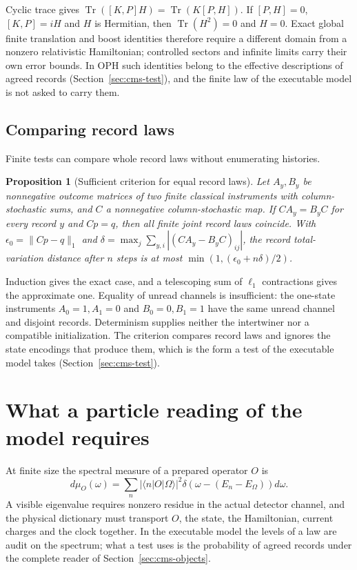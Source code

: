 \documentclass[11pt]{article}
\newtheorem{proposition}[theorem]{Proposition}
\begin{document}
Cyclic trace gives $\operatorname{Tr}([K,P]H)=\operatorname{Tr}(K[P,H])$. If
$[P,H]=0$, $[K,P]=iH$ and $H$ is Hermitian, then $\operatorname{Tr}(H^2)=0$ and $H=0$.
Exact global finite translation and boost identities therefore require a different
domain from a nonzero relativistic Hamiltonian; controlled sectors and infinite limits
carry their own error bounds. In OPH such identities belong to the effective
descriptions of agreed records (Section~\ref{sec:cms-test}), and the finite law of the
executable model is not asked to carry them.

\subsection{Comparing record laws}

Finite tests can compare whole record laws without enumerating histories.

\begin{proposition}[Sufficient criterion for equal record laws]
Let $A_y,B_y$ be nonnegative outcome matrices of two finite classical instruments with
column-stochastic sums, and $C$ a nonnegative column-stochastic map. If $CA_y=B_yC$ for every record
$y$ and $Cp=q$, then all finite joint record laws coincide. With
$\epsilon_0=\|Cp-q\|_1$ and $\delta=\max_j\sum_{y,i}|(CA_y-B_yC)_{ij}|$, the record total-variation
distance after $n$ steps is at most $\min(1,(\epsilon_0+n\delta)/2)$.
\end{proposition}

Induction gives the exact case, and a telescoping sum of $\ell_1$ contractions gives the approximate
one. Equality of unread channels is insufficient: the one-state instruments $A_0=1,A_1=0$ and
$B_0=0,B_1=1$ have the same unread channel and disjoint records. Determinism supplies neither the
intertwiner nor a compatible initialization. The criterion compares record laws and
ignores the state encodings that produce them, which is the form a test of the executable
model takes (Section~\ref{sec:cms-test}).

\section{What a particle reading of the model requires}
\label{sec:particle-joins}

At finite size the spectral measure of a prepared operator $O$ is
\[
 d\mu_O(\omega)=\sum_n|\langle n|O|\Omega\rangle|^2
 \delta\!\left(\omega-(E_n-E_\Omega)\right)d\omega.
\]
A visible eigenvalue requires nonzero residue in the actual detector channel, and the
physical dictionary must transport $O$, the state, the Hamiltonian, current charges
and the clock together. In the executable model the levels of a law are audit on the spectrum;
what a test uses is the probability of agreed records under the complete reader of
Section~\ref{sec:cms-objects}.
\end{document}
